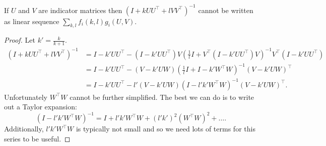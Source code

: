 \begin{lemma}
  If $U$ and $V$ are indicator matrices then ${(I + k UU^\top + l VV^\top)}^{-1}$ cannot be written as linear sequence $\sum_{k,l} f_i(k,l) g_i(U, V)$.
\end{lemma}
\begin{proof}
  Let $k' = \frac{k}{k+1}$.
  \begin{align*}
    {(I + k U U^\top + l VV^\top)}^{-1}
    &= I - k' U U^\top - (I - k' U U^\top) V (\frac{1}{l} I + V^\top (I - k' U U^\top) V)^{-1} V^\top (I - k' U U^\top) \\
    &= I - k' U U^\top - (V - k' U W) (\frac{1}{l} I + I - k' W^\top W)^{-1} (V - k' U W)^\top \\ 
    &= I - k' U U^\top - l' (V - k' U W) (I - l' k' W^\top W)^{-1} (V - k' U W)^\top.
  \end{align*}
  Unfortunately $W^\top W$ cannot be further simplified. The best we can do is to write out a Taylor expansion:
  \[
  (I - l' k' W^\top W)^{-1} = 
  I + l' k' W^\top W + (l' k')^2 (W^\top W)^2 + \ldots.
  \]
  Additionally, $l' k' W^\top W$ is typically not small and so we need lots of terms for this series to be useful.
\end{proof}
